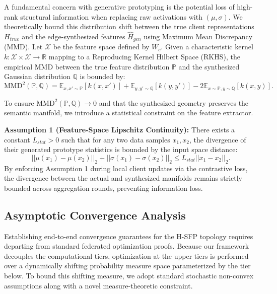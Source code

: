 A fundamental concern with generative prototyping is the potential loss of high-rank structural information when replacing raw activations with $(\mu, \sigma)$. We theoretically bound this distribution shift between the true client representations $H_{true}$ and the edge-synthesized features $\hat{H}_{gen}$ using Maximum Mean Discrepancy (MMD). Let $\mathcal{X}$ be the feature space defined by $W_c$. Given a characteristic kernel $k: \mathcal{X} \times \mathcal{X} \rightarrow \mathbb{R}$ mapping to a Reproducing Kernel Hilbert Space (RKHS), the empirical MMD between the true feature distribution $\mathbb{P}$ and the synthesized Gaussian distribution $\mathbb{Q}$ is bounded by: 
\begin{equation}
\label{eq:mmd_bound}
\text{MMD}^2(\mathbb{P}, \mathbb{Q}) = \mathbb{E}_{x, x' \sim \mathbb{P}}[k(x, x')] + \mathbb{E}_{y, y' \sim \mathbb{Q}}[k(y, y')] - 2\mathbb{E}_{x \sim \mathbb{P}, y \sim \mathbb{Q}}[k(x, y)].
\end{equation}

To ensure $\text{MMD}^2(\mathbb{P}, \mathbb{Q}) \to 0$ and that the synthesized geometry preserves the semantic manifold, we introduce a statistical constraint on the feature extractor. 

\noindent\textbf{Assumption 1 (Feature-Space Lipschitz Continuity):} There exists a constant $L_{stat} > 0$ such that for any two data samples $x_1, x_2$, the divergence of their generated prototype statistics is bounded by the input space distance:
\begin{equation}
\label{eq:lipschitz}
||\mu(x_1) - \mu(x_2)||_2 + ||\sigma(x_1) - \sigma(x_2)||_2 \leq L_{stat} ||x_1 - x_2||_2.
\end{equation}
By enforcing Assumption 1 during local client updates via the contrastive loss, the divergence between the actual and synthesized manifolds remains strictly bounded across aggregation rounds, preventing information loss.

\subsection{Asymptotic Convergence Analysis}
\label{sec_convergence_analysis}

Establishing end-to-end convergence guarantees for the H-SFP topology requires departing from standard federated optimization proofs. Because our framework decouples the computational tiers, optimization at the upper tiers is performed over a dynamically shifting probability measure space parameterized by the tier below. To bound this shifting measure, we adopt standard stochastic non-convex assumptions along with a novel measure-theoretic constraint.

